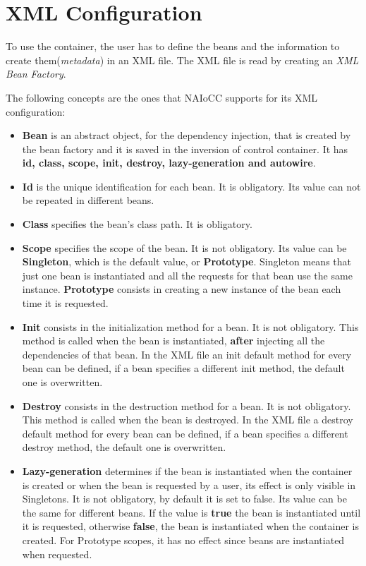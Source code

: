 \documentclass[a4paper, 12pt, notitlepage]{report}
\begin{document}
\section{XML Configuration}

To use the container, the user has to define the beans and the information to create them(\textit{metadata}) in an XML file. The XML file is read by creating an \textit{XML Bean Factory}.

The following concepts are the ones that NAIoCC supports for its XML configuration:

\begin{itemize}
    \item \textbf{Bean} is an abstract object, for the dependency injection, that is created by the bean factory and it is saved in the inversion of control container. It has \textbf{id, class, scope, init, destroy, lazy-generation and autowire}. 
    \item \textbf{Id} is the unique identification for each bean. It is obligatory. Its value can not be repeated in different beans.
    \item \textbf{Class} specifies the bean's class path. It is obligatory.
    \item \textbf{Scope} specifies the scope of the bean. It is not obligatory. Its value can be \textbf{Singleton}, which is the default value, or \textbf{Prototype}. Singleton means that just one bean is instantiated and all the requests for that bean use the same instance. \textbf{Prototype} consists in creating a new instance of the bean each time it is requested.
    \item \textbf{Init} consists in the initialization method for a bean. It is not obligatory. This method is called when the bean is instantiated, \textbf{after} injecting all the dependencies of that bean. In the XML file an init default method for every bean can be defined, if a bean specifies a different init method, the default one is overwritten.
    \item \textbf{Destroy} consists in the destruction method for a bean. It is not obligatory. This method is called when the bean is destroyed. In the XML file a destroy default method for every bean can be defined, if a bean specifies a different destroy method, the default one is overwritten. 
    \item \textbf{Lazy-generation} determines if the bean is instantiated when the container is created or when the bean is requested by a user, its effect is only visible in Singletons. It is not obligatory, by default it is set to false. Its value can be the same for different beans. If the value is \textbf{true} the bean is instantiated until it is requested, otherwise \textbf{false}, the bean is instantiated when the container is created. For Prototype scopes, it has no effect since beans are instantiated when requested.

\end{itemize}
\end{document}
